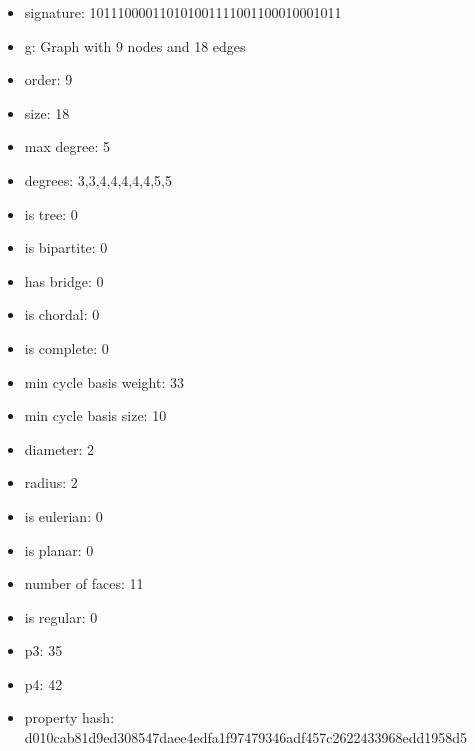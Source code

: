 \newpage
\begin{figure}
\end{figure}
\begin{itemize}
\item signature: 101110000110101001111001100010001011
\item g: Graph with 9 nodes and 18 edges
\item order: 9
\item size: 18
\item max degree: 5
\item degrees: 3,3,4,4,4,4,4,5,5
\item is tree: 0
\item is bipartite: 0
\item has bridge: 0
\item is chordal: 0
\item is complete: 0
\item min cycle basis weight: 33
\item min cycle basis size: 10
\item diameter: 2
\item radius: 2
\item is eulerian: 0
\item is planar: 0
\item number of faces: 11
\item is regular: 0
\item p3: 35
\item p4: 42
\item property hash: d010cab81d9ed308547daee4edfa1f97479346adf457c2622433968edd1958d5
\end{itemize}
